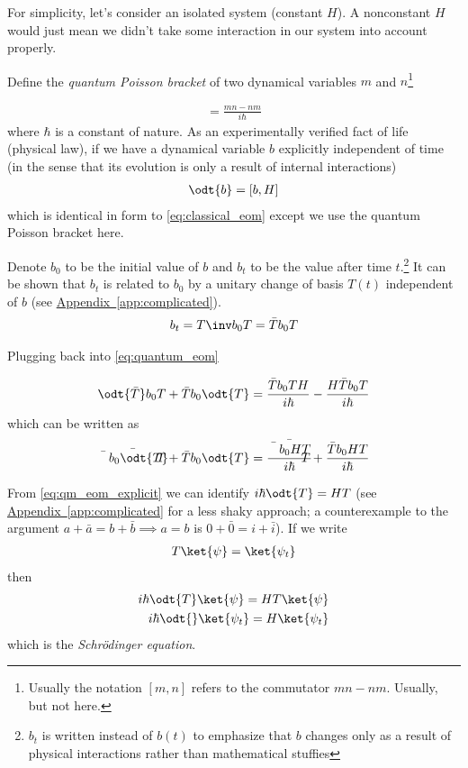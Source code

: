 \documentclass[12pt, oneside, letterpaper, fleqn]{article}
\begin{document}
For simplicity, let's consider an isolated system (constant $H$). A
nonconstant $H$ would just mean we didn't take some interaction in our
system into account properly.

Define the \emph{quantum Poisson bracket} of two dynamical variables $m$
and $n$\footnote{Usually the notation $[m,n]$ refers to the commutator
$mn-nm$. Usually, but not here.}

\begin{align}
[m, n] = \frac{mn - nm}{i\hbar}
\end{align}
where $\hbar$ is a constant of nature. As an experimentally verified
fact of life (physical law), if we have a dynamical variable $b$
explicitly independent of time (in the sense that its evolution is only
a result of internal interactions)
\begin{align}\label{eq:quantum_eom}
\odt{b} = [b, H]
\end{align}
which is identical in form to \eqref{eq:classical_eom} except we use
the quantum Poisson bracket here.

Denote $b_0$ to be the initial value of $b$ and $b_t$ to be the value
after time $t$.\footnote{$b_t$ is written instead of $b(t)$ to emphasize
that $b$ changes only as a result of physical interactions rather than
mathematical stuffies} It can be shown that $b_t$ is related to $b_0$ by
a unitary change of basis $T(t)$ independent of $b$ (see
\hyperref[app:complicated]{Appendix~\ref*{app:complicated}}).
\begin{align}
b_t = T\inv b_0 T = \bar{T} b_0 T
\end{align}

Plugging back into \eqref{eq:quantum_eom}

\begin{align*}
\odt{\bar{T}} b_0 T + \bar{T} b_0 \odt{T}
= \frac{\bar{T}b_0TH}{i\hbar} - \frac{H\bar{T}b_0T}{i\hbar}\\
\end{align*}
which can be written as
\begin{align}\label{eq:qm_eom_explicit}
\bar{\bar{T} b_0 \odt{T}}+ \bar{T} b_0 \odt{T}
= \bar{\frac{\bar{T}b_0HT}{i\hbar}} +
\frac{\bar{T}b_0HT}{i\hbar} 
\end{align}

From \eqref{eq:qm_eom_explicit} we can identify $i\hbar \odt{T} =
HT$ (see \hyperref[app:complicated]{Appendix~\ref*{app:complicated}}
for a less shaky approach; a counterexample to the argument $a + \bar{a}
= b + \bar{b} \implies a = b$ is $0 + \bar{0} = i + \bar{i}$). If we write
\begin{align}\label{eq:schrodinger_psi}
T\ket{\psi} = \ket{\psi_t}
\end{align}
then
\begin{align}\label{eq:schrodinger_equation}
i\hbar \odt{T} \ket{\psi} = HT\ket{\psi}\nonumber\\
i\hbar \odt{}\ket{\psi_t} = H\ket{\psi_t}
\end{align}
which is the \emph{Schr\"odinger equation}.
\end{document}
